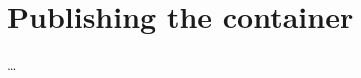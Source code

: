 \documentclass{csse4400}
\begin{document}

\section{Publishing the container}
\dots




\end{document}
